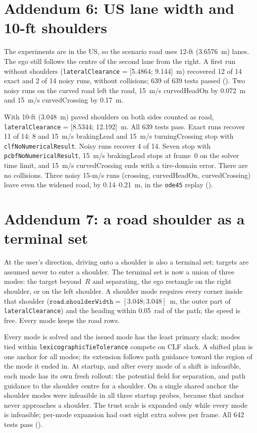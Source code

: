 \documentclass[11pt]{article}
\begin{document}
\section{Addendum 6: US lane width and 10-ft shoulders}
The experiments are in the US, so the scenario road uses 12-ft (3.6576~m)
lanes. The ego still follows the centre of the second lane from the right. A
first run without shoulders (\texttt{lateralClearance} = [5.4864; 9.144]~m)
recovered 12 of 14 exact and 2 of 14 noisy runs, without collisions; 639 of
639 tests passed (). Two noisy runs on
the curved road left the road, 15~m/s curvedHeadOn by 0.072~m and 15~m/s
curvedCrossing by 0.17~m.

With 10-ft (3.048~m) paved shoulders on both sides counted as road,
\texttt{lateralClearance} = [8.5344; 12.192]~m. All 639 tests pass. Exact runs
recover 11 of 14: 8 and 15~m/s brakingLead and 15~m/s turningCrossing stop
with \texttt{clfNoNumericalResult}. Noisy runs recover 4 of 14. Seven stop with
\texttt{pcbfNoNumericalResult}, 15~m/s brakingLead stops at frame~0 on the
solver time limit, and 15~m/s curvedCrossing ends with a tire-domain error. There are no collisions.
Three noisy 15-m/s runs (crossing, curvedHeadOn, curvedCrossing) leave even the
widened road, by 0.14--0.21~m, in the \texttt{ode45} replay
().

\section{Addendum 7: a road shoulder as a terminal set}
At the user's direction, driving onto a shoulder is also a terminal set; targets
are assumed never to enter a shoulder. The terminal set is now a union of three
modes: the target beyond~$R$ and separating, the ego rectangle on the right
shoulder, or on the left shoulder. A shoulder mode requires every corner inside
that shoulder ($\texttt{road.shoulderWidth}=[3.048; 3.048]$~m, the outer part of
\texttt{lateralClearance}) and the heading within 0.05~rad of the path; the
speed is free. Every mode keeps the road rows.

Every mode is solved and the issued mode has the least primary slack; modes
tied within \texttt{lexicographicTieTolerance} compete on CLF slack. A shifted
plan is one anchor for all modes; its extension follows path guidance toward
the region of the mode it ended in. At startup, and after every mode of a shift
is infeasible, each mode has its own fresh rollout: the potential field for
separation, and path guidance to the shoulder centre for a shoulder. On a
single shared anchor the shoulder modes were infeasible in all three startup
probes, because that anchor never approaches a shoulder. The trust scale is
expanded only while every mode is infeasible; per-mode expansion had cost eight
extra solves per frame. All 642 tests pass ().
\end{document}
